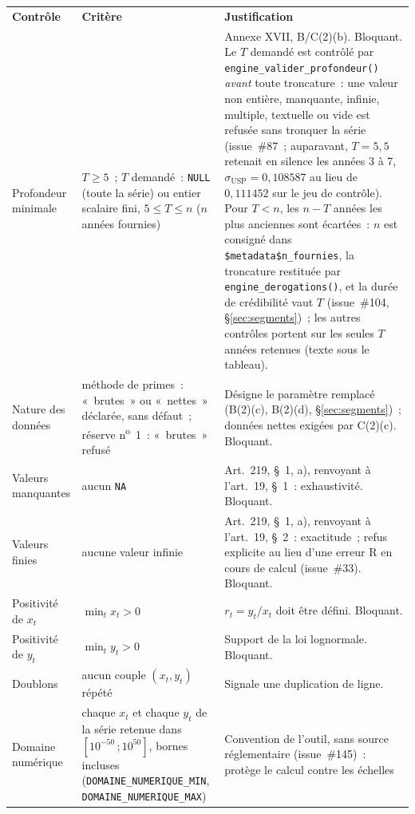 \documentclass[a4paper,11pt]{article}
\newcommand{\code}[1]{\texttt{\small #1}}
\begin{document}
\begin{center}
\small
{}
\begin{tabular}{@{}p{4.4cm}p{5.0cm}p{5.4cm}@{}}
\rowcolor{tableheader}
\textcolor{financeblue}{\textbf{Contrôle}} &
\textcolor{financeblue}{\textbf{Critère}} &
\textcolor{financeblue}{\textbf{Justification}} \\
Profondeur minimale & $T \ge 5$~; $T$ demandé~: \code{NULL} (toute la série) ou entier
scalaire fini, $5 \le T \le n$ ($n$ années fournies) & Annexe XVII, B/C(2)(b). Bloquant.
Le $T$ demandé est contrôlé par \code{engine\_valider\_profondeur()} \emph{avant} toute
troncature~: une valeur non entière, manquante, infinie, multiple, textuelle ou vide est
refusée sans tronquer la série (issue~\#87~; auparavant, $T = 5{,}5$ retenait en silence les
années 3 à 7, $\sigma_{\mathrm{USP}} = 0{,}108587$ au lieu de $0{,}111452$ sur le jeu de
contrôle). Pour $T < n$, les $n - T$ années les plus anciennes sont écartées~: $n$ est
consigné dans \code{\$metadata\$n\_fournies}, la troncature restituée par
\code{engine\_derogations()}, et la durée de crédibilité vaut $T$ (issue~\#104,
§\ref{sec:segments})~; les autres contrôles portent sur les seules $T$ années retenues (texte
sous le tableau). \\
Nature des données & méthode de primes~: «~brutes~» ou «~nettes~» déclarée, sans défaut~;
réserve n\textsuperscript{o}~1~: «~brutes~» refusé & Désigne le paramètre remplacé
(B(2)(c), B(2)(d), §\ref{sec:segments})~; données nettes exigées par C(2)(c). Bloquant. \\
Valeurs manquantes & aucun \code{NA} & Art.~219, §~1, a), renvoyant à l'art.~19, §~1~: exhaustivité. Bloquant. \\
Valeurs finies & aucune valeur infinie & Art.~219, §~1, a), renvoyant à l'art.~19, §~2~: exactitude~; refus explicite au lieu
d'une erreur R en cours de calcul (issue~\#33). Bloquant. \\
Positivité de $x_t$ & $\min_t x_t > 0$ & $r_t = y_t/x_t$ doit être défini. Bloquant. \\
Positivité de $y_t$ & $\min_t y_t > 0$ & Support de la loi lognormale. Bloquant. \\
Doublons & aucun couple $(x_t,y_t)$ répété & Signale une duplication de ligne. \\
Domaine numérique & chaque $x_t$ et chaque $y_t$ de la série retenue dans $[10^{-50}\,;10^{50}]$,
bornes incluses (\code{DOMAINE\_NUMERIQUE\_MIN}, \code{DOMAINE\_NUMERIQUE\_MAX}) & Convention de
l'outil, sans source réglementaire (issue~\#145)~: protège le calcul contre les échelles

\end{tabular}
\end{center}
\end{document}
